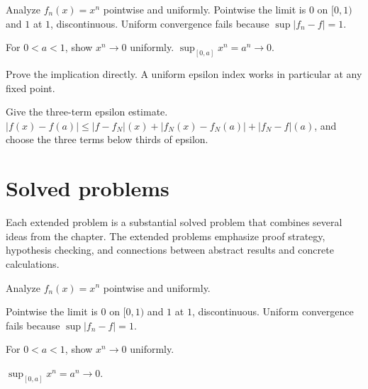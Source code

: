 \begin{example}\label{ex:ii11-worked-01}
Analyze $f_n(x)=x^n$ pointwise and uniformly. Pointwise the limit is $0$ on $[0,1)$ and $1$ at $1$, discontinuous. Uniform convergence fails because $\sup|f_n-f|=1$.
\end{example}

\begin{example}\label{ex:ii11-worked-02}
For $0<a<1$, show $x^n\to0$ uniformly. $\sup_{[0,a]}x^n=a^n\to0$.
\end{example}

\begin{example}\label{ex:ii11-worked-03}
Prove the implication directly. A uniform epsilon index works in particular at any fixed point.
\end{example}

\begin{example}\label{ex:ii11-worked-04}
Give the three-term epsilon estimate. $|f(x)-f(a)|\le|f-f_N|(x)+|f_N(x)-f_N(a)|+|f_N-f|(a)$, and choose the three terms below thirds of epsilon.
\end{example}

\section{Solved problems}
Each extended problem is a substantial solved problem that combines several ideas from the chapter. The extended problems emphasize proof strategy, hypothesis checking, and connections between abstract results and concrete calculations.

\begin{problem}\label{prob:ii11-problem-01}
Analyze $f_n(x)=x^n$ pointwise and uniformly.
\end{problem}
\begin{solution}
Pointwise the limit is $0$ on $[0,1)$ and $1$ at $1$, discontinuous. Uniform convergence fails because $\sup|f_n-f|=1$.
\end{solution}

\begin{problem}\label{prob:ii11-problem-02}
For $0<a<1$, show $x^n\to0$ uniformly.
\end{problem}
\begin{solution}
$\sup_{[0,a]}x^n=a^n\to0$.
\end{solution}

